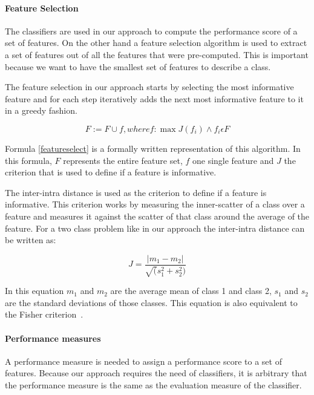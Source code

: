 \paragraph{Feature Selection}
The classifiers are used in our approach to compute the performance score of a set of features.
On the other hand a feature selection algorithm is used to extract a set of features out of all the features that were pre-computed.
This is important because we want to have the smallest set of features to describe a class.

The feature selection in our approach starts by selecting the most informative feature and for each step iteratively adds the next most informative feature to it in a greedy fashion.

\begin{equation}
\label{featureselect}
F := F \cup f, where f: \max{J(f_i)} \wedge f_i \epsilon F
\end{equation}

Formula \ref{featureselect} is a formally written representation of this algorithm.
In this formula, $F$ represents the entire feature set, $f$ one single feature and $J$ the criterion that is used to define if a feature is informative.

The inter-intra distance is used as the criterion to define if a feature is informative.
This criterion works by measuring the inner-scatter of a class over a feature and measures it against the scatter of that class around the average of the feature.
For a two class problem like in our approach the inter-intra distance can be written as:

\begin{equation}
\label{interintra}
J = \frac{|m_1-m_2|}{\sqrt(s^2_1 + s^2_2)}
\end{equation}

In this equation $m_1$ and $m_2$ are the average mean of class 1 and class 2, $s_1$ and $s_2$ are the standard deviations of those classes.
This equation is also equivalent to the Fisher criterion~\cite{malina1981extended}.

\paragraph{Performance measures}
A performance measure is needed to assign a performance score to a set of features.
Because our approach requires the need of classifiers, it is arbitrary that the performance measure is the same as the evaluation measure of the classifier.

